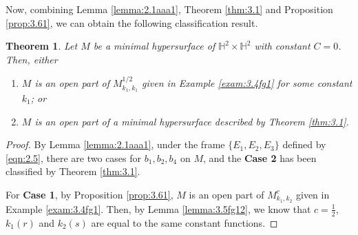 \documentclass[reqno]{amsart}%
\newtheorem{theorem}{Theorem}[section]   %
\theoremstyle{definition}
\numberwithin{equation}{section}
\begin{document}
Now, combining Lemma \ref{lemma:2.1aaa1}, Theorem \ref{thm:3.1} and Proposition \ref{prop:3.61},
we can obtain the following classification result.
\begin{theorem}\label{thm:3.2aa}
Let $M$ be a minimal hypersurface of $\mathbb{H}^2\times \mathbb{H}^2$ with constant $C=0$.
Then, either
%
\begin{enumerate}
\item[(1)]
$M$ is an open part of $M_{k_1,k_1}^{1/2}$ given in Example \ref{exam:3.4fg1} for some constant $k_1$; or

\item[(2)]
$M$ is an open part of a minimal hypersurface described by Theorem \ref{thm:3.1}.
\end{enumerate}
\end{theorem}
%
\begin{proof}
By Lemma \ref{lemma:2.1aaa1}, under the frame $\{E_1,E_2,E_3\}$ defined by \eqref{eqn:2.5}, there are two cases
for $b_1,b_2,b_4$ on $M$, and the {\bf Case 2} has been classified by Theorem \ref{thm:3.1}.

For {\bf Case 1}, by Proposition \ref{prop:3.61}, $M$ is an open part of $M_{k_1,k_2}^c$ given in Example \ref{exam:3.4fg1}.
Then, by Lemma \ref{lemma:3.5fg12}, we know that $c=\frac{1}{2}$, $k_1(r)$ and $k_2(s)$
are equal to the same constant functions.
\end{proof}
\end{document}
